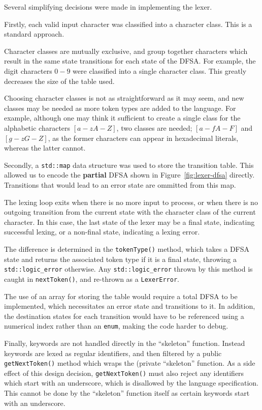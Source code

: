 \documentclass[11pt,a4paper]{scrartcl}
\begin{document}
Several simplifying decisions were made in implementing the lexer.

Firstly, each valid input character was classified into a character class. This is a standard approach\cite{cooper2011}.

Character classes are mutually exclusive, and group together characters which result in the same state transitions for each state of the DFSA. For example, the digit characters $0-9$ were classified into a single character class. This greatly decreases the size of the table used.

Choosing character classes is not as straightforward as it may seem, and new classes may be needed as more token types are added to the language. For example, although one may think it sufficient to create a single class for the alphabetic characters $[a-zA-Z]$, two classes are needed; $[a-fA-F]$ and $[g-zG-Z]$, as the former characters can appear in hexadecimal literals, whereas the latter cannot.

Secondly, a \verb!std::map! data structure was used to store the transition table. This allowed us to encode the \textbf{partial} DFSA shown in Figure~\ref{fig:lexer-dfsa} directly. Transitions that would lead to an error state are ommitted from this map.

The lexing loop exits when there is no more input to process, or when there is no outgoing transition from the current state with the character class of the current character. In this case, the last state of the lexer may be a final state, indicating successful lexing, or a non-final state, indicating a lexing error.

The difference is determined in the \verb|tokenType()| method, which takes a DFSA state and returns the associated token type if it is a final state, throwing a \verb|std::logic_error| otherwise. Any \verb|std::logic_error| thrown by this method is caught in \verb|nextToken()|, and re-thrown as a \verb|LexerError|.

The use of an array for storing the table would require a total DFSA to be implemented, which necessitates an error state and transitions to it. In addition, the destination states for each transition would have to be referenced using a numerical index rather than an \verb|enum|, making the code harder to debug.

Finally, keywords are not handled directly in the ``skeleton'' function. Instead keywords are lexed as regular identifiers, and then filtered by a public \verb|getNextToken()| method which wraps the (private ``skeleton'' function. As a side effect of this design decision, \verb|getNextToken()| must also reject any identifiers which start with an underscore, which is disallowed by the language specification. This cannot be done by the ``skeleton'' function itself as certain keywords start with an underscore.
\end{document}

